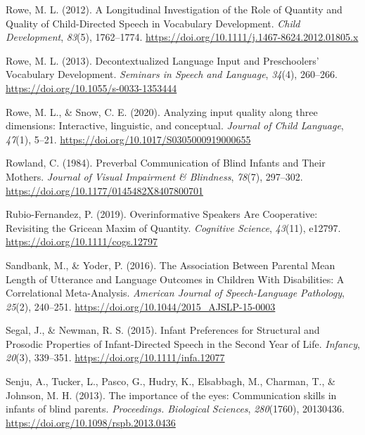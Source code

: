 \documentclass[
  man,floatsintext]{apa6}
\newlength{\cslhangindent}
\newlength{\cslentryspacingunit} %
\newenvironment{CSLReferences}[2] %
 {%
  \setlength{\parindent}{0pt}
  \ifodd #1
  \let\oldpar\par
  \def\par{\hangindent=\cslhangindent\oldpar}
  \fi
  \setlength{\parskip}{#2\cslentryspacingunit}
 }%
 {}
\begin{document}
\begin{CSLReferences}{1}{0}
\leavevmode{}%
Rowe, M. L. (2012). A {Longitudinal Investigation} of the {Role} of {Quantity} and {Quality} of {Child-Directed Speech} in {Vocabulary Development}. \emph{Child Development}, \emph{83}(5), 1762--1774. \url{https://doi.org/10.1111/j.1467-8624.2012.01805.x}

\leavevmode{}%
Rowe, M. L. (2013). Decontextualized {Language Input} and {Preschoolers}' {Vocabulary Development}. \emph{Seminars in Speech and Language}, \emph{34}(4), 260--266. \url{https://doi.org/10.1055/s-0033-1353444}

\leavevmode{}%
Rowe, M. L., \& Snow, C. E. (2020). Analyzing input quality along three dimensions: Interactive, linguistic, and conceptual. \emph{Journal of Child Language}, \emph{47}(1), 5--21. \url{https://doi.org/10.1017/S0305000919000655}

\leavevmode{}%
Rowland, C. (1984). Preverbal {Communication} of {Blind Infants} and {Their Mothers}. \emph{Journal of Visual Impairment \& Blindness}, \emph{78}(7), 297--302. \url{https://doi.org/10.1177/0145482X8407800701}

\leavevmode{}%
Rubio-Fernandez, P. (2019). Overinformative {Speakers Are Cooperative}: {Revisiting} the {Gricean Maxim} of {Quantity}. \emph{Cognitive Science}, \emph{43}(11), e12797. \url{https://doi.org/10.1111/cogs.12797}

\leavevmode{}%
Sandbank, M., \& Yoder, P. (2016). The {Association Between Parental Mean Length} of {Utterance} and {Language Outcomes} in {Children With Disabilities}: {A Correlational Meta-Analysis}. \emph{American Journal of Speech-Language Pathology}, \emph{25}(2), 240--251. \url{https://doi.org/10.1044/2015_AJSLP-15-0003}

\leavevmode{}%
Segal, J., \& Newman, R. S. (2015). Infant {Preferences} for {Structural} and {Prosodic Properties} of {Infant-Directed Speech} in the {Second Year} of {Life}. \emph{Infancy}, \emph{20}(3), 339--351. \url{https://doi.org/10.1111/infa.12077}

\leavevmode{}%
Senju, A., Tucker, L., Pasco, G., Hudry, K., Elsabbagh, M., Charman, T., \& Johnson, M. H. (2013). The importance of the eyes: Communication skills in infants of blind parents. \emph{Proceedings. Biological Sciences}, \emph{280}(1760), 20130436. \url{https://doi.org/10.1098/rspb.2013.0436}


\end{CSLReferences}
\end{document}
